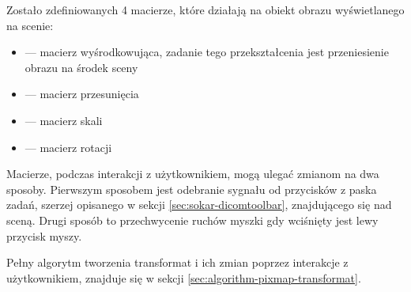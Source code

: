 Zostało zdefiniowanych 4 macierze, które działają na obiekt obrazu wyświetlanego na scenie:
\begin{itemize}
    \item {} --- macierz wyśrodkowująca, zadanie tego przekształcenia jest przeniesienie obrazu na środek sceny
    \item {} --- macierz przesunięcia
    \item {} --- macierz skali
    \item {} --- macierz rotacji
\end{itemize}

\par
Macierze, podczas interakcji z użytkownikiem, mogą ulegać zmianom na dwa sposoby.
Pierwszym sposobem jest odebranie sygnału od przycisków z paska zadań, szerzej opisanego w sekcji \ref{sec:sokar-dicomtoolbar}, znajdującego się nad sceną.
Drugi sposób to przechwycenie ruchów myszki gdy wciśnięty jest lewy przycisk myszy.
\par
Pełny algorytm tworzenia transformat i ich zmian poprzez interakcje z użytkownikiem, znajduje się w sekcji \ref{sec:algorithm-pixmap-transformat}.